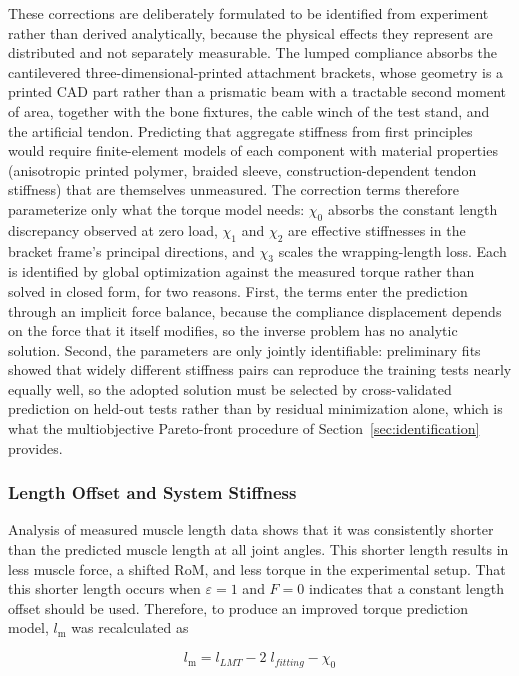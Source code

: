 These corrections are deliberately formulated to be identified from experiment rather than derived analytically, because the physical effects they represent are distributed and not separately measurable. The lumped compliance absorbs the cantilevered three-dimensional-printed attachment brackets, whose geometry is a printed CAD part rather than a prismatic beam with a tractable second moment of area, together with the bone fixtures, the cable winch of the test stand, and the artificial tendon. Predicting that aggregate stiffness from first principles would require finite-element models of each component with material properties (anisotropic printed polymer, braided sleeve, construction-dependent tendon stiffness) that are themselves unmeasured. The correction terms therefore parameterize only what the torque model needs: $\chi_{0}$ absorbs the constant length discrepancy observed at zero load, $\chi_{1}$ and $\chi_{2}$ are effective stiffnesses in the bracket frame's principal directions, and $\chi_{3}$ scales the wrapping-length loss. Each is identified by global optimization against the measured torque rather than solved in closed form, for two reasons. First, the terms enter the prediction through an implicit force balance, because the compliance displacement depends on the force that it itself modifies, so the inverse problem has no analytic solution. Second, the parameters are only jointly identifiable: preliminary fits showed that widely different stiffness pairs can reproduce the training tests nearly equally well, so the adopted solution must be selected by cross-validated prediction on held-out tests rather than by residual minimization alone, which is what the multiobjective Pareto-front procedure of Section~\ref{sec:identification} provides.

\subsubsection{Length Offset and System Stiffness}\label{sec:offset_stiffness}

Analysis of measured muscle length data shows that it was consistently shorter than the predicted muscle length at all joint angles. This shorter length results in less muscle force, a shifted RoM, and less torque in the experimental setup. That this shorter length occurs when $\varepsilon=1$ and $F=0$ indicates that a constant length offset should be used. Therefore, to produce an improved torque prediction model, $l_\text{m}$ was recalculated as

\begin{equation}
    l_\text{m} = l_{LMT} - 2\;l_{fitting} - \chi_{0} 
    \label{eq:Lm}
\end{equation}

